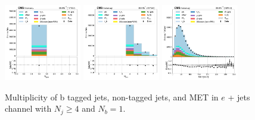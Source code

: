 \begin{figure}[htb!]
    \centering
    \includegraphics[width=0.3\textwidth]{chapters/Analysis/sectionPlots/figures/data_mc_overlays/ejet_2016_cat_gt4_eq1_signal_linear_jet_n_bjets}
    \includegraphics[width=0.3\textwidth]{chapters/Analysis/sectionPlots/figures/data_mc_overlays/ejet_2016_cat_gt4_eq1_signal_linear_jet_n_jets}
    \includegraphics[width=0.3\textwidth]{chapters/Analysis/sectionPlots/figures/data_mc_overlays/ejet_2016_cat_gt4_eq1_signal_linear_misc_met_mag}
    \caption{Multiplicity of b tagged jets, non-tagged jets, and MET in
    $e$ + jets channel with $N_{j} \geq 4$ and $N_{b} = 1$.
    \label{fig:analysis:plots:ejet_1_jetmet}}
\end{figure}

